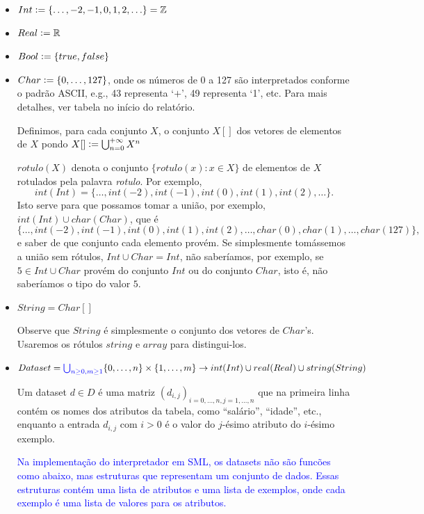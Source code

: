 \documentclass[12pt]{article}
\newcommand{\blu}{\textcolor{blue}}
\newcommand{\defeq}{\vcentcolon=}
\begin{document}
\begin{itemize}
\item $Int \defeq \{\ldots, -2, -1, 0, 1, 2, \ldots\} = \mathbb{Z}$

\item $Real \defeq  \mathbb{R}$
\item $Bool \defeq \{true, false\}$
\item $Char \defeq \{0, \ldots, 127\}$, onde os números de 0 a 127 são interpretados conforme o padrão ASCII, e.g., 43 representa `$+$', 49 representa `1', etc. Para mais detalhes, ver tabela no início do relatório.

Definimos, para cada conjunto $X$, o conjunto $X[]$ dos vetores de elementos de $X$ pondo $X[] \defeq \bigcup_{n = 0}^{+\infty} X^n$

$rotulo(X)$ denota o conjunto $\{rotulo(x): x\in X\}$ de elementos de $X$ rotulados pela palavra {\it rotulo}. Por exemplo, $$int(Int) = \{\ldots, int(-2), int(-1), int(0), int(1), int(2), \ldots\}.$$ Isto serve para que possamos tomar a união, por exemplo, $int(Int) \cup char(Char)$, que é 
$$\{\ldots, int(-2), int(-1), int(0),  int(1), int(2), \ldots, char(0), char(1), \ldots, char(127)\},$$
e saber de que conjunto cada elemento provém. Se simplesmente tomássemos a união sem rótulos, $Int \cup Char = Int$, não saberíamos, por exemplo, se $5\in Int \cup Char$ provém do conjunto $Int$ ou do conjunto $Char$, isto é, não saberíamos o tipo do valor $5$.

\item $String = Char[]$

Observe que $String$ é simplesmente o conjunto dos vetores de $Char$'s. Usaremos os rótulos $string$ e $array$ para distingui-los.



\item $Dataset = \blu{\bigcup_{n\geq 0, m\geq 1}} \{0, \ldots, n\} \times \{1, \ldots, m\} \rightarrow int(Int) \cup real(Real) \cup string(String)$

Um dataset $d\in D$ é uma matriz $(d_{i, j})_{i= 0, \ldots, n, j = 1, \ldots, n}$ que na primeira linha contém os nomes dos atributos da tabela, como ``salário'', ``idade'', etc., enquanto a entrada $d_{i, j}$ com $i > 0$ é o valor do $j$-ésimo atributo do $i$-ésimo exemplo.

\blu{Na implementação do interpretador em SML, os datasets não são funcões como abaixo, mas estruturas que representam um conjunto de dados. Essas estruturas contém uma lista de atributos e uma lista de exemplos, onde cada exemplo é uma lista de valores para os atributos.}




\end{itemize}
\end{document}
